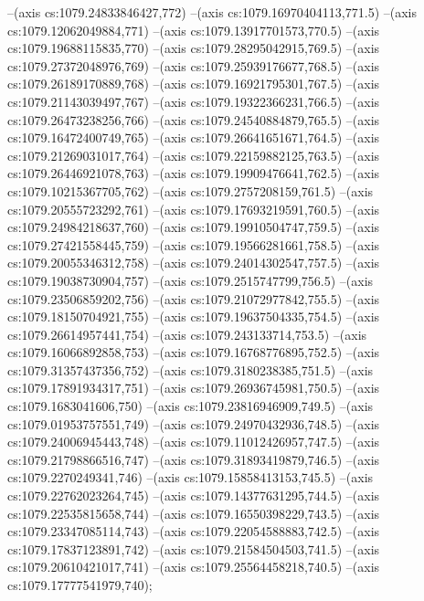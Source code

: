 --(axis cs:1079.24833846427,772)
--(axis cs:1079.16970404113,771.5)
--(axis cs:1079.12062049884,771)
--(axis cs:1079.13917701573,770.5)
--(axis cs:1079.19688115835,770)
--(axis cs:1079.28295042915,769.5)
--(axis cs:1079.27372048976,769)
--(axis cs:1079.25939176677,768.5)
--(axis cs:1079.26189170889,768)
--(axis cs:1079.16921795301,767.5)
--(axis cs:1079.21143039497,767)
--(axis cs:1079.19322366231,766.5)
--(axis cs:1079.26473238256,766)
--(axis cs:1079.24540884879,765.5)
--(axis cs:1079.16472400749,765)
--(axis cs:1079.26641651671,764.5)
--(axis cs:1079.21269031017,764)
--(axis cs:1079.22159882125,763.5)
--(axis cs:1079.26446921078,763)
--(axis cs:1079.19909476641,762.5)
--(axis cs:1079.10215367705,762)
--(axis cs:1079.2757208159,761.5)
--(axis cs:1079.20555723292,761)
--(axis cs:1079.17693219591,760.5)
--(axis cs:1079.24984218637,760)
--(axis cs:1079.19910504747,759.5)
--(axis cs:1079.27421558445,759)
--(axis cs:1079.19566281661,758.5)
--(axis cs:1079.20055346312,758)
--(axis cs:1079.24014302547,757.5)
--(axis cs:1079.19038730904,757)
--(axis cs:1079.2515747799,756.5)
--(axis cs:1079.23506859202,756)
--(axis cs:1079.21072977842,755.5)
--(axis cs:1079.18150704921,755)
--(axis cs:1079.19637504335,754.5)
--(axis cs:1079.26614957441,754)
--(axis cs:1079.243133714,753.5)
--(axis cs:1079.16066892858,753)
--(axis cs:1079.16768776895,752.5)
--(axis cs:1079.31357437356,752)
--(axis cs:1079.3180238385,751.5)
--(axis cs:1079.17891934317,751)
--(axis cs:1079.26936745981,750.5)
--(axis cs:1079.1683041606,750)
--(axis cs:1079.23816946909,749.5)
--(axis cs:1079.01953757551,749)
--(axis cs:1079.24970432936,748.5)
--(axis cs:1079.24006945443,748)
--(axis cs:1079.11012426957,747.5)
--(axis cs:1079.21798866516,747)
--(axis cs:1079.31893419879,746.5)
--(axis cs:1079.2270249341,746)
--(axis cs:1079.15858413153,745.5)
--(axis cs:1079.22762023264,745)
--(axis cs:1079.14377631295,744.5)
--(axis cs:1079.22535815658,744)
--(axis cs:1079.16550398229,743.5)
--(axis cs:1079.23347085114,743)
--(axis cs:1079.22054588883,742.5)
--(axis cs:1079.17837123891,742)
--(axis cs:1079.21584504503,741.5)
--(axis cs:1079.20610421017,741)
--(axis cs:1079.25564458218,740.5)
--(axis cs:1079.17777541979,740);
